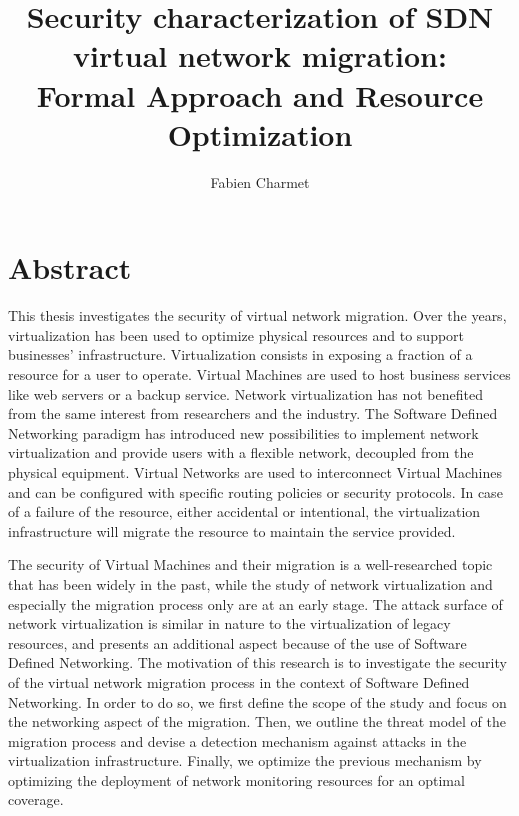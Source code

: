 \documentclass[a4paper, 11pt]{report}
\title{\LARGE \bf Security characterization of SDN virtual network migration:\\ Formal Approach and Resource Optimization}
\author{Fabien Charmet}
\theoremstyle{definition}
\begin{document}
% 

\maketitle
\chapter*{Abstract}
This thesis investigates the security of virtual network migration. Over the years, virtualization has been used to optimize physical resources and to support businesses’ infrastructure. Virtualization consists in exposing a fraction of a resource for a user to operate. Virtual Machines are used to host business services like web servers or a backup service. Network virtualization has not benefited from the same interest from researchers and the industry. The Software Defined Networking paradigm has introduced new possibilities to implement network virtualization and provide users with a flexible network, decoupled from the physical equipment. Virtual Networks are used to interconnect Virtual Machines and can be configured with specific routing policies or security protocols. In case of a failure of the resource, either accidental or intentional, the virtualization infrastructure will migrate the resource to maintain the service provided.

The security of Virtual Machines and their migration is a well-researched topic that has been widely in the past, while the study of network virtualization and especially the migration process only are at an early stage. The attack surface of network virtualization is similar in nature to the virtualization of legacy resources, and presents an additional aspect because of the use of Software Defined Networking.
The motivation of this research is to investigate the security of the virtual network migration process in the context of Software Defined Networking. In order to do so, we first define the scope of the study and focus on the networking aspect of the migration. Then, we outline the threat model of the migration process and devise a detection mechanism against attacks in the virtualization infrastructure. Finally, we optimize the previous mechanism by optimizing the deployment of network monitoring resources for an optimal coverage.
    
\end{document}
